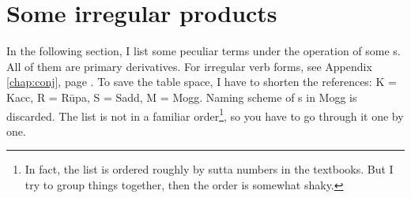 \section*{Some irregular products}\label{sec:irrprod}

In the following section, I list some peculiar terms under the operation of some s. All of them are primary derivatives. For irregular verb forms, see Appendix \ref{chap:conj}, page \pageref{sec:irrverb}. To save the table space, I have to shorten the references: K = Kacc, R = R\=upa, S = Sadd, M = Mogg. Naming scheme of s in Mogg is discarded. The list is not in a familiar order\footnote{In fact, the list is ordered roughly by sutta numbers in the textbooks. But I try to group things together, then the order is somewhat shaky.}, so you have to go through it one by one.

